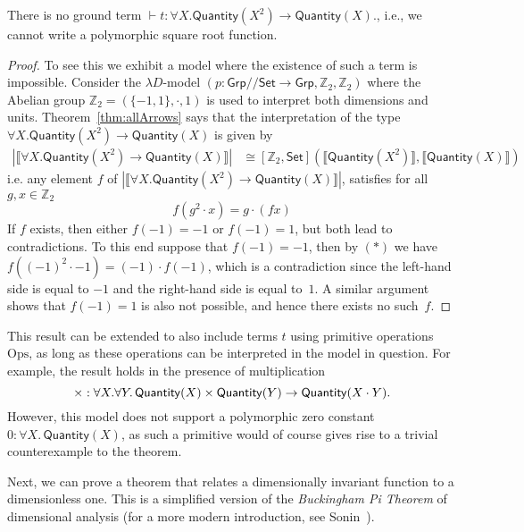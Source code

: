 \documentclass[a4paper,UKenglish]{lipics}
\theoremstyle{plain}
\newcommand{\msf}[1]{\mathsf{#1}} %
\newcommand{\Grp}{\msf{Grp}}
\newcommand{\Set}{\msf{Set}}
\newcommand{\GroupSet}[1]{[#1,\Set]}
\newcommand{\Lslice}[1]{#1/\!/\Set}
\newcommand{\GrpSet}{\Lslice{\Grp}}
\newcommand{\bbZ}{\mathbb{Z}}
\newcommand{\sem}[1]{\ensuremath{\llbracket #1 \rrbracket}}
\newcommand{\qnt}{\msf{Quantity}}
\newcommand{\Dvar}{X}
\begin{document}
\begin{theorem}
\label{thm:UninhabType}
 There is no ground term  $\vdash t : \forall X . \qnt(X^2) \rightarrow \qnt(X)$., i.e., we cannot write a polymorphic square root function.
\end{theorem}
\begin{proof}
To see this we exhibit a model where the existence of such a term is impossible. Consider the $\lambda D$-model $(p:\GrpSet \rightarrow \Grp, \mathbb{Z}_2, \mathbb{Z}_2)$  where the Abelian group $\mathbb{Z}_2 = (\{ -1, 1\},\cdot,1)$ is used to interpret both dimensions and units. Theorem~\ref{thm:allArrows} says that the interpretation of the type $\forall X . \qnt(X^2) \rightarrow \qnt(X)$ is given by
\begin{align*}
  |\sem{\forall X . \qnt(X^2) \rightarrow \qnt(X)}|  &  \cong \GroupSet{\mathbb{Z}_2} (\sem{\qnt (X^2)}, \sem{\qnt(X)})
\end{align*}
i.e. any element $f$ of $ |\sem{\forall X . \qnt(X^2) \rightarrow \qnt(X)}|$, satisfies for all $g, x \in \bbZ_2$
\begin{equation}
f (g^2 \cdot x) = g \cdot (fx) \tag{$\ast$}
\end{equation}
If $f$ exists, then either $f(-1) = -1$ or $f(-1) = 1$, but both lead to contradictions. To this end suppose that $f(-1) = -1$, then by $(\ast)$
we have
$f((-1)^2 \cdot -1) = (-1) \cdot f(-1)$,
which is a contradiction since the left-hand side is equal to $-1$ and the right-hand side is equal to~$1$. A similar argument shows that $f(-1)=1$ is also not possible, and hence there exists no such~$f$.
\end{proof}

This result can be extended to also include terms $t$ using primitive
operations $\mathrm{Ops}$, as long as these operations can be interpreted
in the model in question.
For example, the result holds in the presence of multiplication
\[
\times:\forall X.\forall Y.\,\qnt(X)\times\qnt (Y)\to\qnt(X\cdot Y)\text.
\]
However, this model does not
support a polymorphic zero constant $0 : \forall \Dvar
.\, \qnt(\Dvar)$, as such a primitive would of course gives rise
to a trivial counterexample to the theorem.

Next, we can prove a theorem that relates a dimensionally invariant function to a dimensionless one. This is a simplified version of the \emph{Buckingham Pi Theorem} of dimensional analysis \cite{buckingham1914physically} (for a more modern introduction, see Sonin~\cite{sonin2001physical}).
\end{document}
